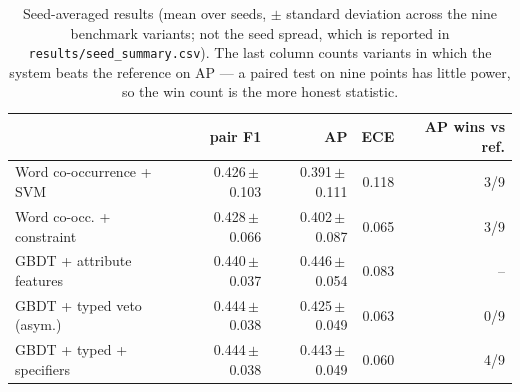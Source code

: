 \begin{table}[t]
\centering
\caption{Seed-averaged results (mean over seeds, $\pm$ standard deviation across the nine benchmark variants; not the seed spread, which is reported in \texttt{results/seed\_summary.csv}). The last column counts variants in which the system beats the reference on AP --- a paired test on nine points has little power, so the win count is the more honest statistic.}
\label{tab:seeds}
\small
\begin{tabular}{lrrrr}
\toprule
 & pair F1 & AP & ECE & AP wins vs ref. \\
\midrule
Word co-occurrence + SVM & 0.426\,$\pm$\,0.103 & 0.391\,$\pm$\,0.111 & 0.118 & 3/9 \\
Word co-occ. + constraint & 0.428\,$\pm$\,0.066 & 0.402\,$\pm$\,0.087 & 0.065 & 3/9 \\
GBDT + attribute features & 0.440\,$\pm$\,0.037 & 0.446\,$\pm$\,0.054 & 0.083 & -- \\
GBDT + typed veto (asym.) & 0.444\,$\pm$\,0.038 & 0.425\,$\pm$\,0.049 & 0.063 & 0/9 \\
GBDT + typed + specifiers & 0.444\,$\pm$\,0.038 & 0.443\,$\pm$\,0.049 & 0.060 & 4/9 \\
\bottomrule
\end{tabular}
\end{table}

